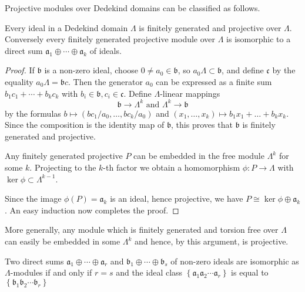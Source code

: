 Projective modules over Dedekind domains can be classified as follows.

\begin{lem}\label{lem:1.5}
	Every ideal in a Dedekind domain $\Lambda$ is finitely generated and projective over $\Lambda$. Conversely every finitely generated projective module over $\Lambda$ is isomorphic to a direct sum $\mathfrak{a}_{1} \oplus \cdots \oplus \mathfrak{a}_{k}$ of ideals.
\end{lem}

\begin{proof}
	If $\mathfrak{b}$ is a non-zero ideal, choose $0 \neq a_{0} \in \mathfrak{b}$, so $a_{0} \Lambda \subset \mathfrak{b}$, and define $\mathfrak{c}$ by the equality $a_{0} \Lambda=\mathfrak{b} c$. Then the generator $a_{0}$ can be expressed as a finite sum $b_{1} c_{1}+\cdots+b_{k} c_{k}$ with $b_{i} \in \mathfrak{b}, c_{i} \in \mathfrak{c}$. Define $\Lambda$-linear mappings
\[
\mathfrak{b} \to \Lambda^{k} \text{ and } \Lambda^{k} \to \mathfrak{b}
\]
by the formulas $b \mapsto\left(bc_{1} / a_{0}, \ldots, bc_{k} / a_{0}\right)$ and $\left(x_{1}, \ldots, x_{k}\right) \mapsto b_{1} x_{1}+\ldots+b_{k} x_{k}$. Since the composition is the identity map of $\mathfrak{b}$, this proves that $\mathfrak{b}$ is finitely generated and projective.

Any finitely generated projective $P$ can be embedded in the free module $\Lambda^{k}$ for some $k$. Projecting to the $k$-th factor we obtain a homomorphism $\phi: P \to \Lambda$ with $\ker\phi \subset \Lambda^{k-1}$.

Since the image $\phi(P)=\mathfrak{a}_{k}$ is an ideal, hence projective, we have $P \cong \ker \phi \oplus \mathfrak{a}_{k}$. An easy induction now completes the proof.
\end{proof}

\begin{rem*}
	More generally, any module which is finitely generated and torsion free over $\Lambda$ can easily be embedded in some $\Lambda^{k}$ and hence, by this argument, is projective.
\end{rem*}

\begin{thm}
	[Steiniz]
 \label{thm:1.6}
	Two direct sums $\mathfrak{a}_{1} \oplus \cdots \oplus \mathfrak{a}_{r}$ and $\mathfrak{b}_{1} \oplus \cdots \oplus \mathfrak{b}_{s}$ of non-zero ideals are isomorphic as $\Lambda$-modules if and only if $r=s$ and the ideal class $\left\{\mathfrak{a}_{1} \mathfrak{a}_{2} \cdots \mathfrak{a}_{r}\right\}$ is equal to $\left\{\mathfrak{b}_{1} \mathfrak{b}_{2} \cdots \mathfrak{b}_{r}\right\}$
\end{thm}

